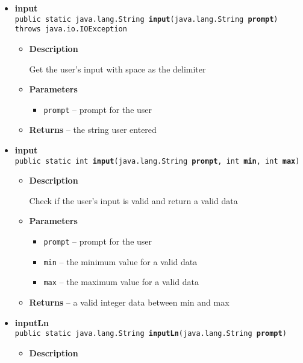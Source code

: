 {{{{{\begin{itemize}
{\begin{itemize}
{Determine if a player complete his/her mission in a certain time
}
\item{
{\bf  Parameters}
  \begin{itemize}
   \item{
\texttt{calendar} -- the calendar of the player/mission}
  \end{itemize}
}%
\item{{\bf  Returns} -- 
true if the player doesn't fail to comply the calendar; false otherwise 
}%
\end{itemize}
}%
\item{ 
{\bf  input}\\
\texttt{public static java.lang.String\ {\bf  input}(\texttt{java.lang.String} {\bf  prompt}) throws java.io.IOException
\label{personOfInterest.Game.input(java.lang.String)}}%
\begin{itemize}
\item{
{\bf  Description}

Get the user's input with space as the delimiter
}
\item{
{\bf  Parameters}
  \begin{itemize}
   \item{
\texttt{prompt} -- prompt for the user}
  \end{itemize}
}%
\item{{\bf  Returns} -- 
the string user entered 
}%
\end{itemize}
}%
\item{ 
{\bf  input}\\
\texttt{public static int\ {\bf  input}(\texttt{java.lang.String} {\bf  prompt},
\texttt{int} {\bf  min},
\texttt{int} {\bf  max})
\label{personOfInterest.Game.input(java.lang.String, int, int)}}%
\begin{itemize}
\item{
{\bf  Description}

Check if the user's input is valid and return a valid data
}
\item{
{\bf  Parameters}
  \begin{itemize}
   \item{
\texttt{prompt} -- prompt for the user}
   \item{
\texttt{min} -- the minimum value for a valid data}
   \item{
\texttt{max} -- the maximum value for a valid data}
  \end{itemize}
}%
\item{{\bf  Returns} -- 
a valid integer data between min and max 
}%
\end{itemize}
}%
\item{ 
{\bf  inputLn}\\
\texttt{public static java.lang.String\ {\bf  inputLn}(\texttt{java.lang.String} {\bf  prompt})
\label{personOfInterest.Game.inputLn(java.lang.String)}}%
\begin{itemize}
\item{
{\bf  Description}

}
\end{itemize}}
\end{itemize}}}}}}
